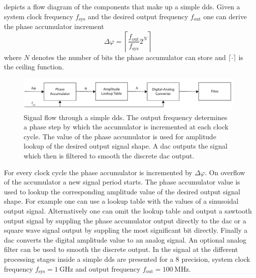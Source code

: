  depicts a flow diagram of the components
that make up a simple \gls{dds}. Given a system clock frequency $f_\text{sys}$
and the desired output frequency $f_\text{out}$ one can derive the phase
accumulator increment
\begin{equation}
  \Delta\varphi
  =
  \left\lceil\frac{f_\text{out}}{f_\text{sys}}2^N\right\rceil
  \label{eq:dds_phase_increment}
\end{equation}
where $N$ denotes the number of bits the phase accumulator can store and
$\lceil\cdot\rceil$ is the ceiling function.
\begin{figure}[htb]
  \centering
  \includegraphics[width=\textwidth]
  {../figure/digital-signal-synthesis/simple-architecture.pdf}
  \caption{Signal flow through a simple \gls{dds}. The output frequency
    determines a phase step by which the accumulator is incremented at each
    clock cycle. The value of the phase accumulator is used for amplitude
    lookup of the desired output signal shape. A \gls{dac} outputs the signal
    which then is filtered to smooth the discrete \gls{dac} output.
  }\label{fig:dds_simple_architecture}
\end{figure}
For every clock cycle the phase accumulator is incremented by $\Delta\varphi$.
On overflow of the accumulator a new signal period starts. The phase
accumulator value is used to lookup the corresponding amplitude value of the
desired output signal shape. For example one can use a lookup table with the
values of a sinusoidal output signal. Alternatively one can omit the lookup
table and output a sawtooth output signal by suppling the phase accumulator
output directly to the \gls{dac} or a square wave signal output by suppling
the most significant bit directly. Finally a \gls{dac} converts the digital
amplitude value to an analog signal. An optional analog filter can be used to
smooth the discrete output. In  the signal at the
different processing stages inside a simple \gls{dds} are presented for a
\SI{8}{\bit} precision, system clock frequency
$f_\text{sys}=\SI{1}{\giga\hertz}$ and output frequency
$f_\text{out}=\SI{100}{\mega\hertz}$.
